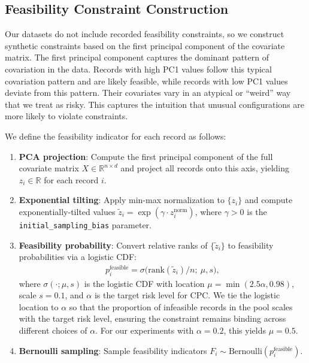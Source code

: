 \subsection{Feasibility Constraint Construction}
\label{subsec:feasibility_construction}

Our datasets do not include recorded feasibility constraints, so we construct synthetic constraints based on the first principal component of the covariate matrix. The first principal component captures the dominant pattern of covariation in the data. Records with high PC1 values follow this typical covariation pattern and are likely feasible, while records with low PC1 values deviate from this pattern. Their covariates vary in an atypical or ``weird'' way that we treat as risky. This captures the intuition that unusual configurations are more likely to violate constraints.

We define the feasibility indicator for each record as follows:
\begin{enumerate}
    \item \textbf{PCA projection}: Compute the first principal component of the full covariate matrix $X \in \mathbb{R}^{n \times d}$ and project all records onto this axis, yielding $z_i \in \mathbb{R}$ for each record $i$.

    \item \textbf{Exponential tilting}: Apply min-max normalization to $\{z_i\}$ and compute exponentially-tilted values $\tilde{z}_i = \exp(\gamma \cdot z_i^{\text{norm}})$, where $\gamma > 0$ is the \texttt{initial\_sampling\_bias} parameter.

    \item \textbf{Feasibility probability}: Convert relative ranks of $\{\tilde{z}_i\}$ to feasibility probabilities via a logistic CDF:
    \begin{align}
        p_i^{\text{feasible}} = \sigma\Big(\text{rank}(\tilde{z}_i) / n;\ \mu, s\Big),
    \end{align}
    where $\sigma(\cdot; \mu, s)$ is the logistic CDF with location $\mu = \min(2.5\alpha, 0.98)$, scale $s = 0.1$, and $\alpha$ is the target risk level for CPC. We tie the logistic location to $\alpha$ so that the proportion of infeasible records in the pool scales with the target risk level, ensuring the constraint remains binding across different choices of $\alpha$. For our experiments with $\alpha = 0.2$, this yields $\mu = 0.5$.

    \item \textbf{Bernoulli sampling}: Sample feasibility indicators $F_i \sim \text{Bernoulli}(p_i^{\text{feasible}})$.
\end{enumerate}

